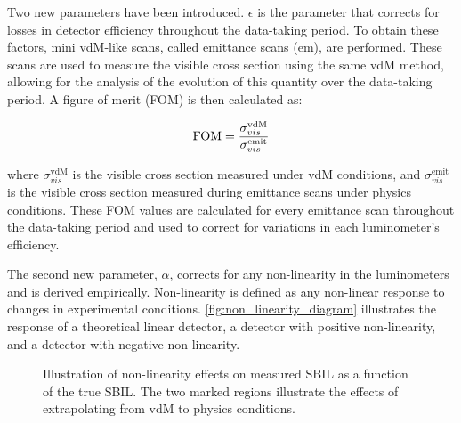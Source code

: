 Two new parameters have been introduced. \(\epsilon\) is the parameter that corrects for losses in detector efficiency throughout the data-taking period. To obtain these factors, mini vdM-like scans, called emittance scans (em), are performed. These scans are used to measure the visible cross section using the same vdM method, allowing for the analysis of the evolution of this quantity over the data-taking period. A figure of merit (FOM) is then calculated as:

\begin{equation}
    \centering
    \text{FOM} = \frac{\sigma^{\text{vdM}}_{vis}}{\sigma^{\text{emit}}_{vis}}
    \label{eq:figure_of_merit}
\end{equation}

where \(\sigma^{\text{vdM}}_{vis}\) is the visible cross section measured under vdM conditions, and \(\sigma^{\text{emit}}_{vis}\) is the visible cross section measured during emittance scans under physics conditions. These FOM values are calculated for every emittance scan throughout the data-taking period and used to correct for variations in each luminometer's efficiency.

The second new parameter, \(\alpha\), corrects for any non-linearity in the luminometers and is derived empirically. Non-linearity is defined as any non-linear response to changes in experimental conditions. \autoref{fig:non_linearity_diagram} illustrates the response of a theoretical linear detector, a detector with positive non-linearity, and a detector with negative non-linearity.

\begin{figure}[!htb]
    \centering
    \caption[Non-linearity effects on SBIL]{Illustration of non-linearity effects on measured SBIL as a function of the true SBIL. The two marked regions illustrate the effects of extrapolating from vdM to physics conditions.}
    \label{fig:non_linearity_diagram}
\end{figure}

